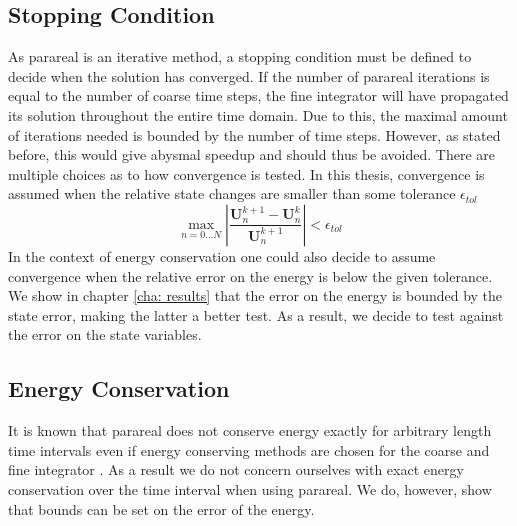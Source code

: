 \subsection{Stopping Condition}
As parareal is an iterative method, a stopping condition must be defined to decide when the solution has converged. If the number of parareal iterations is equal to the number of coarse time steps, the fine integrator will have propagated its solution throughout the entire time domain. Due to this, the maximal amount of iterations needed is bounded by the number of time steps. However, as stated before, this would give abysmal speedup and should thus be avoided. There are multiple choices as to how convergence is tested. In this thesis, convergence is assumed when the relative state changes are smaller than some tolerance $\epsilon_{tol}$
\[\max_{n=0...N}\left|\frac{\textbf{U}^{k+1}_n -\textbf{U}^{k}_n}{\textbf{U}^{k+1}_n} \right| < \epsilon_{tol}\]
In the context of energy conservation one could also decide to assume convergence when the relative error on the energy is below the given tolerance. We show in chapter \ref{cha: results} that the error on the energy is bounded by the state error, making the latter a better test. As a result, we decide to test against the error on the state variables.

\subsection{Energy Conservation}
It is known that parareal does not conserve energy exactly for arbitrary length time intervals even if energy conserving methods are chosen for the coarse and fine integrator \cite{gander_analysis_2014}. As a result we do not concern ourselves with exact energy conservation over the time interval when using parareal. We do, however, show that bounds can be set on the error of the energy.

